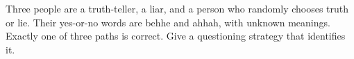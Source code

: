 Three people are a truth-teller, a liar, and a person who randomly chooses truth or lie. Their yes-or-no words are behhe and ahhah, with unknown meanings. Exactly one of three paths is correct. Give a questioning strategy that identifies it.
